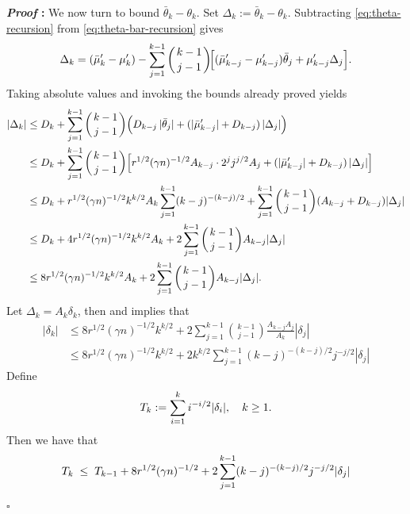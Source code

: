 \documentclass{article}
\renewenvironment{proof}{\noindent\textbf{\textit{Proof }:}}{\hfill$\square$}
\begin{document}
\begin{proof}
We now turn to bound $\bar{\theta}_k-\theta_k$.
Set $\Delta_k:=\bar\theta_k-\theta_k$.
Subtracting \eqref{eq:theta-recursion} from \eqref{eq:theta-bar-recursion} gives
\[
  \Delta_k
  =(\bar\mu_k'-\mu_k')
   -\sum_{j=1}^{k-1}\binom{k-1}{\,j-1\,}
     \!\Bigl[(\bar\mu_{k-j}'-\mu_{k-j}')\bar\theta_j
             +\mu_{k-j}'\Delta_j\Bigr].
\]
Taking absolute values and invoking the bounds already proved yields
\begin{equation}\label{eq:Delta-recursion}
    \begin{aligned}
        |\Delta_k|
    &\le D_k
      +\sum_{j=1}^{k-1}\binom{k-1}{\,j-1\,}
        \Bigl(D_{k-j}\,|\bar\theta_j|
                 +(|\bar\mu_{k-j}'|+D_{k-j})\,|\Delta_j|\Bigr) \\
    &\leq D_k
      +\sum_{j=1}^{k-1}\binom{k-1}{\,j-1\,}
        \Bigl[r^{1/2}(\gamma n)^{-1/2}A_{k-j}\cdot 2^jj^{j/2}A_j
                 +(|\bar\mu_{k-j}'|+D_{k-j})\,|\Delta_j|\Bigr] \\
    &\leq D_k
      +r^{1/2}(\gamma n)^{-1/2}k^{k/2}A_k\sum_{j=1}^{k-1}(k-j)^{-(k-j)/2} + \sum_{j=1}^{k-1}\binom{k-1}{\,j-1\,} (A_{k-j}+D_{k-j})|\Delta_j| \\
      &\leq D_k
      +4r^{1/2}(\gamma n)^{-1/2} k^{k/2}A_k + 2 \sum_{j=1}^{k-1}\binom{k-1}{\,j-1\,} A_{k-j}|\Delta_j| \\
      &\leq 8r^{1/2}(\gamma n)^{-1/2} k^{k/2}A_k + 2 \sum_{j=1}^{k-1}\binom{k-1}{\,j-1\,} A_{k-j}|\Delta_j|.
    \end{aligned}
\end{equation}
Let $\Delta_k = A_k \delta_k$, then  and  implies that
\begin{equation}
    \label{eq:delta-recursion}
    \begin{aligned}
        |\delta_k| &\leq 8r^{1/2}(\gamma n)^{-1/2} k^{k/2} + 2\sum_{j=1}^{k-1}\binom{k-1}{\,j-1\,} \frac{A_{k-j}A_j}{A_k} |\delta_j| \\
        &\leq 8r^{1/2}(\gamma n)^{-1/2} k^{k/2} + 2k^{k/2}\sum_{j=1}^{k-1} (k-j)^{-(k-j)/2}j^{-j/2}|\delta_j|
    \end{aligned}
\end{equation}
Define
\begin{equation}
    \notag
    T_k := \sum_{i=1}^k i^{-i/2}|\delta_i|, \quad k\geq 1.
\end{equation}
Then we have that
\begin{equation}
    \notag
    \begin{aligned}
        T_k \; &\leq \; T_{k-1} + 8r^{1/2}(\gamma n)^{-1/2} + 2 \sum_{j=1}^{k-1}(k-j)^{-(k-j)/2}j^{-j/2}|\delta_j| \\

\end{aligned}
\end{equation}
\end{proof}
\end{document}
